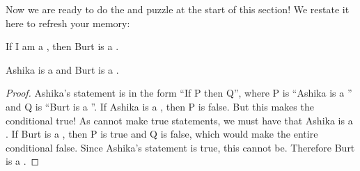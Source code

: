 \documentclass{tufte-book}
\begin{document}


Now we are ready to do the \knights and \knaves puzzle at the start of this section! We restate it here to refresh your memory:
  \begin{dialogue}
     If I am a \knight, then Burt is a \knave.
  \end{dialogue}

  \begin{claim}
    Ashika is a \knight and Burt is a \knave.
  \end{claim}

  \begin{proof}
    Ashika's statement is in the form ``If P then Q'', where P is ``Ashika is a \knight'' and Q is ``Burt is a \knave''. If Ashika is a \knave, then P is false. But this makes the conditional true! As \knaves cannot make true statements, we must have that Ashika is a \knight. If Burt is a \knight, then P is true and Q is false, which would make the entire conditional false. Since Ashika's statement is true, this cannot be. Therefore Burt is a \knave.
  \end{proof} 
\end{document}
